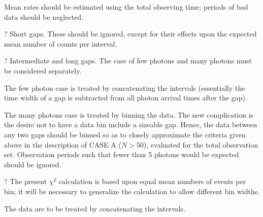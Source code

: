 {\list

Mean rates should be estimated using the total
observing time; periods of bad data should be neglected.

}



\?? Short gaps.  These should be ignored, except for their effects
upon the expected mean number of counts per interval.

\?? Intermediate and long gaps.  The case of few photons and many
photons must be considered separately.

\itemitem{$\bullet$}The few photon case is treated by concatenating the
intervals (essentially the time width of a gap is
subtracted from all photon arrival times after the gap).

\itemitem{$\bullet$}The many photons case is treated by binning the data.  
The new complication is the desire not to have a data
bin include a sizeable gap.  Hence, the data between 
any two gaps should be binned so as to closely approximate
the criteria given above in the description of CASE A
($N > 50$), evaluated for the total observation
set.  Observation periods such that fewer than 5 photons
would be expected should be ignored.

\?? The present $\chi^2$ calculation is based upon equal mean numbers
of events per bin; it will be necessary to generalize the
calculation to allow different bin widths.


{\list

The data are to be treated by concatenating the intervals.

}

\vfill\eject
